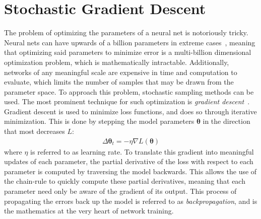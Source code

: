 \section{Stochastic Gradient Descent} \label{sect:sgd}
The problem of optimizing the parameters of a neural net is notoriously tricky. Neural nets can have upwards of a
billion parameters in extreme cases~\citep{huang2018}, meaning that optimizing said parameters to minimize error is a
multi-billion dimensional optimization problem, which is mathematically intractable. Additionally, networks
of any meaningful scale are expensive in time and computation to evaluate, which limits the number of samples
that may be drawn from the parameter space. To approach this problem,
stochastic sampling methods can be used. The most prominent technique for such optimization is \textit{gradient descent}~\citep{goodfellow2016}.
Gradient descent is used to minimize loss functions, and does so through iterative minimization. This is done by stepping
the model parameters $\mathbf{\theta}$ in the direction that most decreases $\mathit{L}$:
 \begin{align}
 	\label{eq:SGD} \Delta \mathbf{\theta}_t = - \eta \nabla \mathit{L}(\mathbf{\theta})
 \end{align}
 where $\eta$ is referred to as learning rate. To translate this gradient into meaningful updates of each parameter, the
partial derivative of the loss with respect to each parameter is computed by traversing the model backwards. This
allows the use of the chain-rule to quickly compute these partial derivatives, meaning that each parameter need
only be aware of the gradient of its output. This process of propagating the errors back up the model is referred
to as \textit{backpropagation}, and is the mathematics at the very heart of network training.

